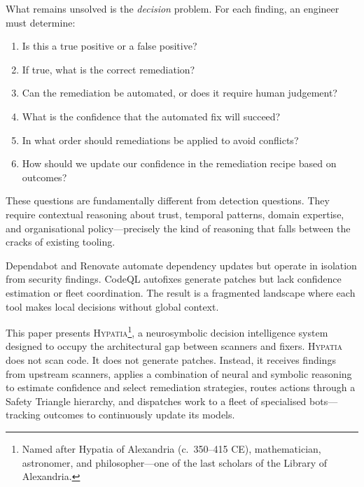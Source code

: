 \documentclass[11pt,a4paper]{article}
\begin{document}
What remains unsolved is the \emph{decision} problem. For each finding, an engineer must determine:
\begin{enumerate}[nosep]
  \item Is this a true positive or a false positive?
  \item If true, what is the correct remediation?
  \item Can the remediation be automated, or does it require human judgement?
  \item What is the confidence that the automated fix will succeed?
  \item In what order should remediations be applied to avoid conflicts?
  \item How should we update our confidence in the remediation recipe based on outcomes?
\end{enumerate}

\noindent These questions are fundamentally different from detection questions. They require contextual reasoning about trust, temporal patterns, domain expertise, and organisational policy---precisely the kind of reasoning that falls between the cracks of existing tooling.

Dependabot \citep{dependabot2017} and Renovate \citep{renovate2017} automate dependency updates but operate in isolation from security findings. CodeQL autofixes \citep{codeql-autofix2024} generate patches but lack confidence estimation or fleet coordination. The result is a fragmented landscape where each tool makes local decisions without global context.

This paper presents \textsc{Hypatia}\footnote{Named after Hypatia of Alexandria (c.\ 350--415 CE), mathematician, astronomer, and philosopher---one of the last scholars of the Library of Alexandria.}, a neurosymbolic decision intelligence system designed to occupy the architectural gap between scanners and fixers. \textsc{Hypatia} does not scan code. It does not generate patches. Instead, it receives findings from upstream scanners, applies a combination of neural and symbolic reasoning to estimate confidence and select remediation strategies, routes actions through a Safety Triangle hierarchy, and dispatches work to a fleet of specialised bots---tracking outcomes to continuously update its models.
\end{document}

